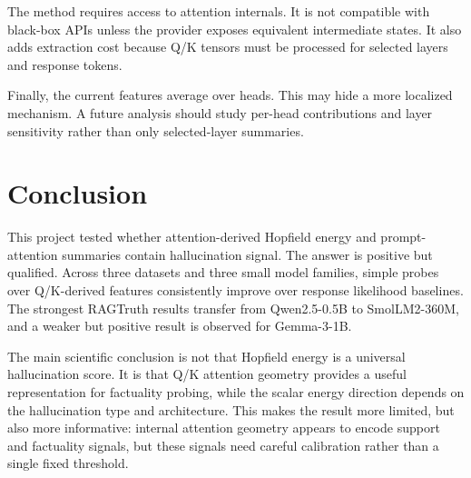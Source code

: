 \documentclass{article}
\begin{document}
The method requires access to attention internals. It is not compatible with black-box APIs unless
the provider exposes equivalent intermediate states. It also adds extraction cost because Q/K tensors
must be processed for selected layers and response tokens.

Finally, the current features average over heads. This may hide a more localized mechanism. A future
analysis should study per-head contributions and layer sensitivity rather than only selected-layer
summaries.

\section{Conclusion}

This project tested whether attention-derived Hopfield energy and prompt-attention summaries contain
hallucination signal. The answer is positive but qualified. Across three datasets and three small
model families, simple probes over Q/K-derived features consistently improve over response
likelihood baselines. The strongest RAGTruth results transfer from Qwen2.5-0.5B to SmolLM2-360M,
and a weaker but positive result is observed for Gemma-3-1B.

The main scientific conclusion is not that Hopfield energy is a universal hallucination score. It is
that Q/K attention geometry provides a useful representation for factuality probing, while the scalar
energy direction depends on the hallucination type and architecture. This makes the result more
limited, but also more informative: internal attention geometry appears to encode support and
factuality signals, but these signals need careful calibration rather than a single fixed threshold.



\end{document}
